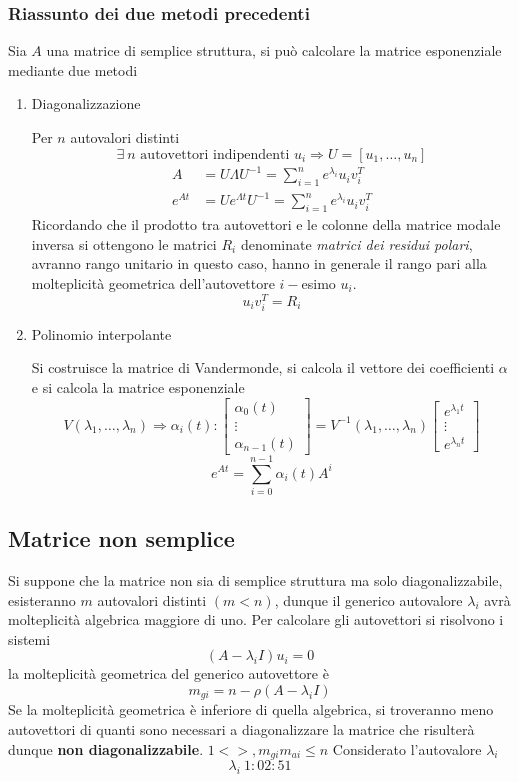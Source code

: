\newpage
\subsubsection{Riassunto dei due metodi precedenti}
Sia $A$ una matrice di semplice struttura, si può calcolare la matrice
esponenziale mediante due metodi
\begin{enumerate}
 \item Diagonalizzazione

 Per $n$ autovalori distinti
 $$
 \exists\ n \text{ autovettori indipendenti } u_i \Rightarrow U=[u_1,\ldots,u_n]
 $$
 $$\begin{aligned}
 A &= U\Lambda U^{-1} = \sum_{i=1}^{n} e^{\lambda_i}u_iv_i^T\\
 e^{At} &= Ue^{\Lambda t} U^{-1} = \sum_{i=1}^{n} e^{\lambda_i}u_iv_i^T
 \end{aligned}$$
 Ricordando che il prodotto tra autovettori e le colonne della matrice modale
inversa si ottengono le matrici $R_i$ denominate \textit{matrici dei residui
polari}, avranno rango unitario in questo caso, hanno in generale il rango pari
alla molteplicità geometrica dell'autovettore $i-$esimo $u_i$.
$$
u_i v_i^T = R_i
$$

\item Polinomio interpolante

Si costruisce la matrice di Vandermonde, si calcola il vettore dei coefficienti
$\alpha$ e si calcola la matrice esponenziale
$$
V(\lambda_1,\ldots,\lambda_n) \Rightarrow \alpha_i(t):
\begin{bmatrix}
\alpha_0(t) \\
\vdots \\
\alpha_{n-1}(t)
\end{bmatrix} = V^{-1}(\lambda_1,\ldots,\lambda_n)
\begin{bmatrix}
e^{\lambda_1t}\\
\vdots \\
e^{\lambda_nt}
\end{bmatrix}
$$
$$
e^{At} =\sum_{i=0}^{n-1} \alpha_i(t)A^i
$$
\end{enumerate}

\subsection{Matrice non semplice}
Si suppone che la matrice non sia di semplice struttura ma solo
diagonalizzabile, esisteranno $m$ autovalori distinti $(m < n)$, dunque il
generico autovalore $\lambda_i$ avrà molteplicità algebrica maggiore di uno.
Per calcolare gli autovettori si risolvono i sistemi
$$
(A-\lambda_iI)u_i=0
$$
la molteplicità geometrica del generico autovettore è
$$
m_{gi}= n-\rho(A-\lambda_iI)
$$
Se la molteplicità geometrica è inferiore di quella algebrica, si troveranno
meno autovettori di quanti sono necessari a diagonalizzare la matrice che
risulterà dunque \textbf{non diagonalizzabile}. $1<>, m_{gi}  m_{ai} \leq n $
Considerato l'autovalore $\lambda_i$
$$
\lambda_i\ 1:02:51
$$
